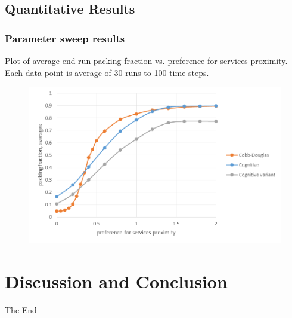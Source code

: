 \documentclass{beamer}
\begin{document}
\subsection{Quantitative Results}

\begin{frame}
\frametitle{Parameter sweep results}
Plot of average end run packing fraction vs. preference for services proximity.  Each data point is average of 30 runs to 100 time steps.
\begin{figure}
\includegraphics[width=0.8\linewidth]{main_results.png}
\end{figure}
\end{frame}

\section{Discussion and Conclusion}




\begin{frame}
\Huge{\centerline{The End}}
\end{frame}

\end{document}
